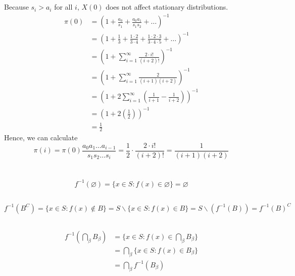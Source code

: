 \documentclass[11pt]{article}
\begin{document}
\section{}
Because $s_i > a_i$ for all $i$, $X(0)$ does not affect stationary distributions.
\begin{equation*}
    \begin{aligned}
        \pi(0) &= \left(1 + \frac{a_0}{s_1} + \frac{a_0 a_1}{s_1 s_2} + \hdots \right)^{-1} \\
        &= \left(1 + \frac{1}{3} + \frac{1 \cdot 2}{3 \cdot 4} + \frac{1 \cdot 2 \cdot 3}{3 \cdot 4 \cdot 5} + \hdots\right)^{-1} \\
        &= \left(1 + \sum_{i=1}^\infty \frac{2 \cdot i!}{(i+2)!} \right)^{-1} \\
        &= \left(1 + \sum_{i=1}^\infty \frac{2}{(i+1)(i+2)} \right)^{-1} \\
        &= \left(1 + 2 \sum_{i=1}^\infty \left(\frac{1}{i+1} - \frac{1}{i+2} \right)\right)^{-1} \\
        &= \left(1 + 2 \left(\frac{1}{2}\right) \right)^{-1} \\
        &= \frac{1}{2}
    \end{aligned}
\end{equation*}
Hence, we can calculate 
\[
    \pi(i) = \pi(0) \frac{a_0 a_1 \hdots a_{i-1}}{s_1 s_2 \hdots s_i} = \frac{1}{2} \cdot \frac{2 \cdot i!}{(i+2)!} = \frac{1}{(i+1)(i+2)}
\]
\newpage
\section{}
\subsection{}
\[
    f^{-1}(\varnothing) = \{x\in S: f(x) \in \varnothing\} = \varnothing
\]
\subsection{}
\[
    f^{-1}(B^C) = \{x\in S: f(x) \notin B\} = S \backslash \{x\in S: f(x) \in B\} = S \backslash (f^{-1}(B)) = f^{-1}(B)^C
\]
\subsection{}
\begin{equation*}
    \begin{aligned}
        f^{-1} \left(\bigcap_\beta B_\beta \right) &= \{x \in S: f(x) \in \bigcap_\beta B_\beta \} \\
        &= \bigcap_\beta \{x \in S: f(x) \in B_\beta\} \\
        &= \bigcap_\beta f^{-1}(B_\beta)
    \end{aligned}
\end{equation*}
\end{document}
